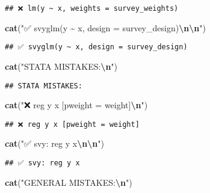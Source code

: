 \documentclass[
]{article}
\newenvironment{Shaded}{\begin{snugshade}}{\end{snugshade}}
\newcommand{\FunctionTok}[1]{\textcolor[rgb]{0.13,0.29,0.53}{\textbf{#1}}}
\newcommand{\NormalTok}[1]{#1}
\newcommand{\SpecialCharTok}[1]{\textcolor[rgb]{0.81,0.36,0.00}{\textbf{#1}}}
\newcommand{\StringTok}[1]{\textcolor[rgb]{0.31,0.60,0.02}{#1}}
\begin{document}
\begin{verbatim}
## ❌ lm(y ~ x, weights = survey_weights)
\end{verbatim}

\begin{Shaded}
\begin{Highlighting}[]
\FunctionTok{cat}\NormalTok{(}\StringTok{"✅ svyglm(y \textasciitilde{} x, design = survey\_design)}\SpecialCharTok{\textbackslash{}n\textbackslash{}n}\StringTok{"}\NormalTok{)}
\end{Highlighting}
\end{Shaded}

\begin{verbatim}
## ✅ svyglm(y ~ x, design = survey_design)
\end{verbatim}

\begin{Shaded}
\begin{Highlighting}[]
\FunctionTok{cat}\NormalTok{(}\StringTok{"STATA MISTAKES:}\SpecialCharTok{\textbackslash{}n}\StringTok{"}\NormalTok{)}
\end{Highlighting}
\end{Shaded}

\begin{verbatim}
## STATA MISTAKES:
\end{verbatim}

\begin{Shaded}
\begin{Highlighting}[]
\FunctionTok{cat}\NormalTok{(}\StringTok{"❌ reg y x [pweight = weight]}\SpecialCharTok{\textbackslash{}n}\StringTok{"}\NormalTok{)}
\end{Highlighting}
\end{Shaded}

\begin{verbatim}
## ❌ reg y x [pweight = weight]
\end{verbatim}

\begin{Shaded}
\begin{Highlighting}[]
\FunctionTok{cat}\NormalTok{(}\StringTok{"✅ svy: reg y x}\SpecialCharTok{\textbackslash{}n\textbackslash{}n}\StringTok{"}\NormalTok{)}
\end{Highlighting}
\end{Shaded}

\begin{verbatim}
## ✅ svy: reg y x
\end{verbatim}

\begin{Shaded}
\begin{Highlighting}[]
\FunctionTok{cat}\NormalTok{(}\StringTok{"GENERAL MISTAKES:}\SpecialCharTok{\textbackslash{}n}\StringTok{"}\NormalTok{)}
\end{Highlighting}
\end{Shaded}
\end{document}
